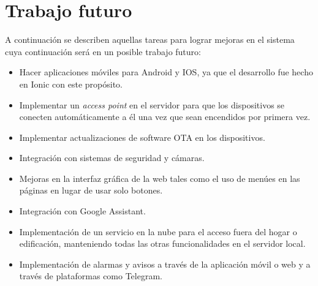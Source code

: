\section{Trabajo futuro}

A continuación se describen aquellas tareas para lograr mejoras en el sistema cuya continuación será en un posible trabajo futuro:

\begin{itemize}
	\item Hacer aplicaciones móviles para Android y IOS, ya que el desarrollo fue hecho en Ionic con este propósito.
	\item Implementar un \textit{access point} en el servidor para que los dispositivos se conecten automáticamente a él una vez que sean encendidos por primera vez.
	\item Implementar actualizaciones de software OTA en los dispositivos.
	\item Integración con sistemas de seguridad y cámaras.
	\item Mejoras en la interfaz gráfica de la web tales como el uso de menúes en las páginas en lugar de usar solo botones.
	\item Integración con Google Assistant.
	\item Implementación de un servicio en la nube para el acceso fuera del hogar o edificación, manteniendo todas las otras funcionalidades en el servidor local.
	\item Implementación de alarmas y avisos a través de la aplicación móvil o web y a través de plataformas como Telegram.
\end{itemize}